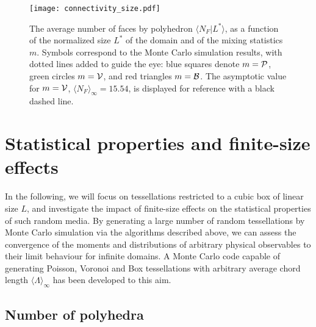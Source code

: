 \documentclass[final,authoryear,5p,times,twocolumn]{elsarticle}
\begin{document}
\begin{figure}[t]
\begin{center}
\texttt{[image: connectivity\_size.pdf]}
\end{center}
\caption{The average number of faces by polyhedron $\langle N_F | L^*\rangle$, as a function of the normalized size $L^*$ of the domain and of the mixing statistics $m$. Symbols correspond to the Monte Carlo simulation results, with dotted lines added to guide the eye: blue squares denote $m={\cal P}$, green circles $m={\cal V}$, and red triangles $m={\cal B}$. The asymptotic value for $m={\cal V}$, ${\langle N_F \rangle}_{\infty}=15.54$, is displayed for reference with a black dashed line.}
\label{connect_size}
\end{figure}

\section{Statistical properties and finite-size effects}
\label{size_effects}

In the following, we will focus on tessellations restricted to a cubic box of linear size $L$, and investigate the impact of finite-size effects on the statistical properties of such random media. By generating a large number of random tessellations by Monte Carlo simulation via the algorithms described above, we can assess the convergence of the moments and distributions of arbitrary physical observables to their limit behaviour for infinite domains. A Monte Carlo code capable of generating Poisson, Voronoi and Box tessellations with arbitrary average chord length ${\langle \Lambda \rangle}_{\infty}$ has been developed to this aim. 

\subsection{Number of polyhedra}
\end{document}
